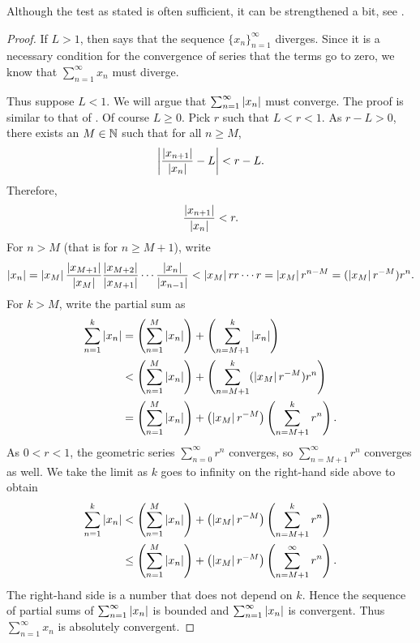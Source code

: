 Although the test as stated is often sufficient, it can be strengthened a
bit, see .

\begin{proof}
If $L > 1$, then
 says that the sequence $\{ x_n \}_{n=1}^\infty$
diverges.  Since it is a necessary condition for the convergence of series
that the terms go to zero, we know that $\sum_{n=1}^\infty x_n$ must diverge.

Thus suppose $L < 1$.
We will argue that $\sum_{n=1}^\infty \left\lvert {x_n} \right\rvert$ must converge.
The proof is similar to that of .  Of course $L \geq
0$.  
Pick
$r$ such that $L < r < 1$.  As $r-L > 0$, there exists an $M \in {\mathbb{N}}$ such that for
all $n \geq M$,
\begin{equation*}
\left\lvert {\frac{\left\lvert {x_{n+1}} \right\rvert}{\left\lvert {x_n} \right\rvert} - L} \right\rvert < r-L .
\end{equation*}
Therefore,
\begin{equation*}
\frac{\left\lvert {x_{n+1}} \right\rvert}{\left\lvert {x_n} \right\rvert} < r .
\end{equation*}
For $n > M$ (that is for $n \geq M+1$),
write
\begin{equation*}
\left\lvert {x_n} \right\rvert =
\left\lvert {x_M} \right\rvert
\frac{\left\lvert {x_{M+1}} \right\rvert}{\left\lvert {x_{M}} \right\rvert}
\frac{\left\lvert {x_{M+2}} \right\rvert}{\left\lvert {x_{M+1}} \right\rvert}
\cdots
\frac{\left\lvert {x_{n}} \right\rvert}{\left\lvert {x_{n-1}} \right\rvert}
<
\left\lvert {x_M} \right\rvert
r r \cdots r = \left\lvert {x_M} \right\rvert r^{n-M} = (\left\lvert {x_M} \right\rvert r^{-M}) r^n .
\end{equation*}
For $k > M$, write the partial sum as
\begin{equation*}
\begin{split}
\sum_{n=1}^k \left\lvert {x_n} \right\rvert
& =
\left(\sum_{n=1}^{M} \left\lvert {x_n} \right\rvert \right)
+
\left(\sum_{n=M+1}^{k} \left\lvert {x_n} \right\rvert \right)
\\
& <
\left(\sum_{n=1}^{M} \left\lvert {x_n} \right\rvert \right)
+
\left(\sum_{n=M+1}^{k} 
(\left\lvert {x_M} \right\rvert r^{-M}) r^n
\right)
\\
& =
\left(\sum_{n=1}^{M} \left\lvert {x_n} \right\rvert \right)
+
\bigl(\left\lvert {x_M} \right\rvert r^{-M}\bigr)
\left( \sum_{n=M+1}^{k} r^n \right) .
\end{split}
\end{equation*}
As $0 < r < 1$, the geometric series
$\sum_{n=0}^{\infty} r^n$ converges, so
$\sum_{n=M+1}^{\infty} r^n$ converges as well.  We take the
limit as $k$ goes to infinity on the right-hand side above to obtain
\begin{equation*}
\begin{split}
\sum_{n=1}^k \left\lvert {x_n} \right\rvert
& <
\left(\sum_{n=1}^{M} \left\lvert {x_n} \right\rvert \right)
+
\bigl(\left\lvert {x_M} \right\rvert r^{-M}\bigr)
\left( \sum_{n=M+1}^{k} r^n \right) 
\\
& \leq
\left(\sum_{n=1}^{M} \left\lvert {x_n} \right\rvert \right)
+
\bigl(\left\lvert {x_M} \right\rvert r^{-M}\bigr)
\left( \sum_{n=M+1}^{\infty} r^n \right) .
\end{split}
\end{equation*}
The right-hand side is a number that does not depend on $k$.
Hence the sequence of partial sums of $\sum_{n=1}^\infty \left\lvert {x_n} \right\rvert$ is bounded
and $\sum_{n=1}^\infty \left\lvert {x_n} \right\rvert$ is convergent.  Thus $\sum_{n=1}^\infty x_n$ is
absolutely convergent.
\end{proof}

